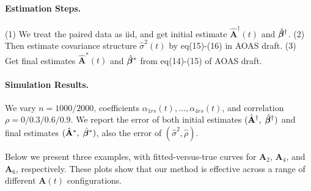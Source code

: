 \documentclass[10pt]{notes}
\begin{document}
\paragraph{Estimation Steps.} (1) We treat the paired data as iid, and get initial estimate $\hat{\mathbf{A}}^\dagger(t)$ and $\hat{\bm{\beta}}^\dagger$. (2) Then estimate covariance structure $\hat{\sigma}^2(t)$ by eq(15)-(16) in AOAS draft.
(3) Get final estimates $\hat{\mathbf{A}}^*(t)$ and $\hat{\bm{\beta}}^*$ from eq(14)-(15) of AOAS draft.

\paragraph{Simulation Results.} We vary $n=1000/2000$, coefficients $\alpha_{1rs}(t),\dots,\alpha_{4rs}(t)$, and correlation $\rho=0/0.3/0.6/0.9$. We report the error of both initial estimates $(\hat{\mathbf{A}}^\dagger,\;\hat{\bm{\beta}}^\dagger)$ and final estimates $(\hat{\mathbf{A}}^*,\;\hat{\bm{\beta}}^*)$, also the error of $(\hat{\sigma}^2, \hat{\rho})$.



\clearpage
\noindent
Below we present three examples, with fitted-versus-true curves for $\mathbf{A}_2$, $\mathbf{A}_4$, and $\mathbf{A}_6$, respectively. These plots show that our method is effective across a range of different $\mathbf{A}(t)$ configurations.
\end{document}
